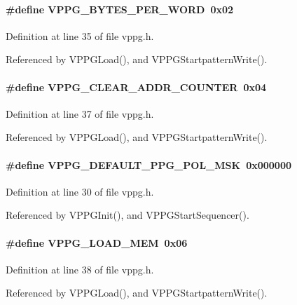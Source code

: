 \paragraph[{VPPG\_\-BYTES\_\-PER\_\-WORD}]{\setlength{\rightskip}{0pt plus 5cm}\#define VPPG\_\-BYTES\_\-PER\_\-WORD~0x02}\hfill\label{vppg_8h_a275265bae4ee64a719118578d577a9b9}


Definition at line 35 of file vppg.h.

Referenced by VPPGLoad(), and VPPGStartpatternWrite().
\paragraph[{VPPG\_\-CLEAR\_\-ADDR\_\-COUNTER}]{\setlength{\rightskip}{0pt plus 5cm}\#define VPPG\_\-CLEAR\_\-ADDR\_\-COUNTER~0x04}\hfill\label{vppg_8h_af610ae540df479b8d36c1d5c50c05767}


Definition at line 37 of file vppg.h.

Referenced by VPPGLoad(), and VPPGStartpatternWrite().
\paragraph[{VPPG\_\-DEFAULT\_\-PPG\_\-POL\_\-MSK}]{\setlength{\rightskip}{0pt plus 5cm}\#define VPPG\_\-DEFAULT\_\-PPG\_\-POL\_\-MSK~0x000000}\hfill\label{vppg_8h_a5669dd950e356d43543bf05367609b3b}


Definition at line 30 of file vppg.h.

Referenced by VPPGInit(), and VPPGStartSequencer().
\paragraph[{VPPG\_\-LOAD\_\-MEM}]{\setlength{\rightskip}{0pt plus 5cm}\#define VPPG\_\-LOAD\_\-MEM~0x06}\hfill\label{vppg_8h_a50b5cef4353c208647a6327494fb2534}


Definition at line 38 of file vppg.h.

Referenced by VPPGLoad(), and VPPGStartpatternWrite().
